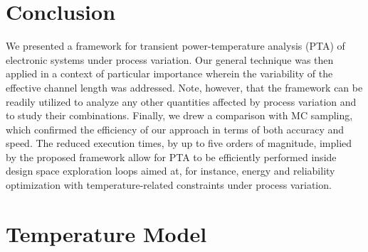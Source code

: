 \section{Conclusion}

We presented a framework for transient power-temperature analysis (PTA) of
electronic systems under process variation. Our general technique was then
applied in a context of particular importance wherein the variability of the
effective channel length was addressed. Note, however, that the framework can be
readily utilized to analyze any other quantities affected by process variation
and to study their combinations. Finally, we drew a comparison with MC sampling,
which confirmed the efficiency of our approach in terms of both accuracy and
speed. The reduced execution times, by up to five orders of magnitude, implied
by the proposed framework allow for PTA to be efficiently performed inside
design space exploration loops aimed at, for instance, energy and reliability
optimization with temperature-related constraints under process variation.

\section{Temperature Model}

